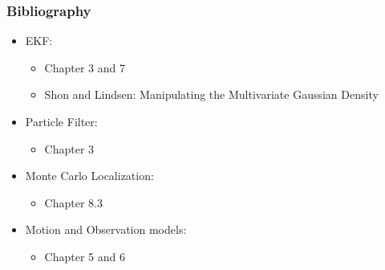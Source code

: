 \begin{frame}
	\frametitle{Bibliography}
	

    \begin{itemize}

        \item EKF:
        \begin{itemize}
            \item Chapter 3 and 7 \cite{thrun2005probabilistic}
            \item Shon and Lindsen: Manipulating the Multivariate Gaussian Density
        \end{itemize}
        
        \item Particle Filter:
        \begin{itemize}
            \item Chapter 3 \cite{thrun2005probabilistic}
        \end{itemize}
        

        \item Monte Carlo Localization:
        \begin{itemize}
            \item Chapter 8.3 \cite{thrun2005probabilistic}
        \end{itemize}
        
        
        \item Motion and Observation models:
        \begin{itemize}
            \item Chapter 5 and 6 \cite{thrun2005probabilistic}
        \end{itemize}

    \end{itemize}
	
	\printbibliography
	
\end{frame}